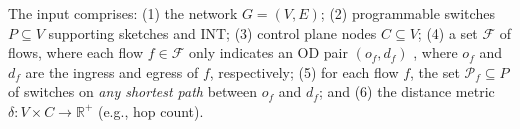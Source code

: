 
 The input comprises:
(1) the network $G = (V, E)$;
(2) programmable switches $P \subseteq V$ supporting sketches and INT;
(3) control plane nodes $C \subseteq V$;
(4) a set $\mathcal{F}$ of flows, where each flow $f \in \mathcal{F}$ only indicates an OD pair $(o_f, d_f)$ \cite{liu2016one,anup2022hetero}, where $o_f$ and $d_f$ are the ingress and egress of $f$, respectively; 
(5) for each flow $f$, the set $\mathcal{P}_f \subseteq P$ of switches on \emph{any shortest path} between $o_f$ and $d_f$;
and (6) the distance metric $\delta: V \times C \to \mathbb{R}^+$ (e.g., hop count).


